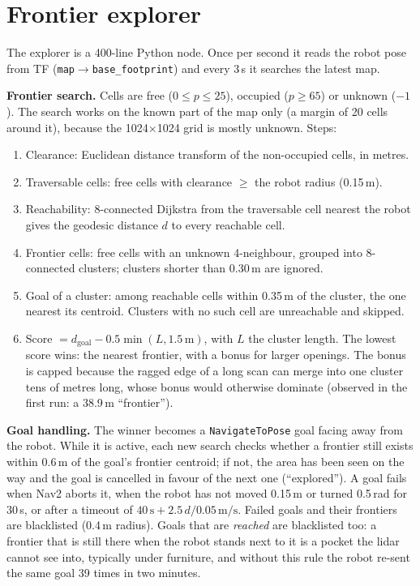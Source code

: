 \documentclass[10pt,twocolumn]{article}
\begin{document}
\section{Frontier explorer}\label{sec:explorer}
The explorer is a 400-line Python node. Once per second it reads the robot pose from TF
(\texttt{map}$\to$\texttt{base\_footprint}) and every 3\,s it searches the latest map.

\textbf{Frontier search.} Cells are free ($0\le p\le25$), occupied ($p\ge65$) or unknown ($-1$).
The search works on the known part of the map only (a margin of 20 cells around it), because
the 1024$\times$1024 grid is mostly unknown. Steps:
\begin{enumerate}
\item Clearance: Euclidean distance transform of the non-occupied cells, in metres.
\item Traversable cells: free cells with clearance $\ge$ the robot radius (0.15\,m).
\item Reachability: 8-connected Dijkstra from the traversable cell nearest the robot gives the
  geodesic distance $d$ to every reachable cell.
\item Frontier cells: free cells with an unknown 4-neighbour, grouped into 8-connected clusters;
  clusters shorter than 0.30\,m are ignored.
\item Goal of a cluster: among reachable cells within 0.35\,m of the cluster, the one nearest its
  centroid. Clusters with no such cell are unreachable and skipped.
\item Score $= d_{\text{goal}} - 0.5\min(L, 1.5\,\text{m})$, with $L$ the cluster length. The
  lowest score wins: the nearest frontier, with a bonus for larger openings. The bonus is
  capped because the ragged edge of a long scan can merge into one cluster tens of metres long,
  whose bonus would otherwise dominate (observed in the first run: a 38.9\,m ``frontier'').
\end{enumerate}

\textbf{Goal handling.} The winner becomes a \texttt{NavigateToPose} goal facing away from the
robot. While it is active, each new search checks whether a frontier still exists within 0.6\,m
of the goal's frontier centroid; if not, the area has been seen on the way and the goal is
cancelled in favour of the next one (``explored''). A goal fails when Nav2 aborts it, when the
robot has not moved 0.15\,m or turned 0.5\,rad for 30\,s, or after a timeout of
$40\,\text{s} + 2.5\,d/0.05\,\text{m/s}$. Failed goals and their frontiers are blacklisted
(0.4\,m radius). Goals that are \emph{reached} are blacklisted too: a frontier that is still
there when the robot stands next to it is a pocket the lidar cannot see into, typically under
furniture, and without this rule the robot re-sent the same goal 39 times in two minutes.
\end{document}
